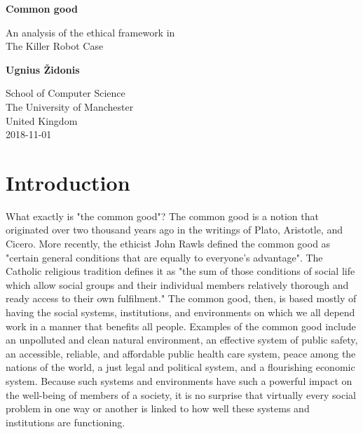 \documentclass[a4paper]{article}
\begin{document}
\begin{titlepage}
	\begin{center}
	\vspace*{1cm}
 
	\Huge{\textbf{Common good}}
 
	\vspace{0.5cm}
	\Large An analysis of the ethical framework in \\The Killer Robot Case
 
	\vspace{1.5cm}
 
	\textbf{Ugnius Židonis}
 
 	\vfill
	\vspace{0.8cm}
 
	School of Computer Science\\
	The University of Manchester\\
	United Kingdom\\
	2018-11-01 
	\end{center}
\end{titlepage}

\section*{Introduction}
What exactly is "the common good"? The common good is a notion that originated over two thousand years ago in the writings of Plato, Aristotle, and Cicero. More recently, the ethicist John Rawls defined the common good as "certain general conditions that are equally to everyone's advantage". The Catholic religious tradition defines it as "the sum of those conditions of social life which allow social groups and their individual members relatively thorough and ready access to their own fulfilment." The common good, then, is based mostly of having the social systems, institutions, and environments on which we all depend work in a manner that benefits all people. Examples of the common good include an unpolluted and clean natural environment, an effective system of public safety, an accessible, reliable, and affordable public health care system, peace among the nations of the world, a just legal and political system, and a flourishing economic system. Because such systems and environments have such a powerful impact on the well-being of members of a society, it is no surprise that virtually every social problem in one way or another is linked to how well these systems and institutions are functioning.
\end{document}
